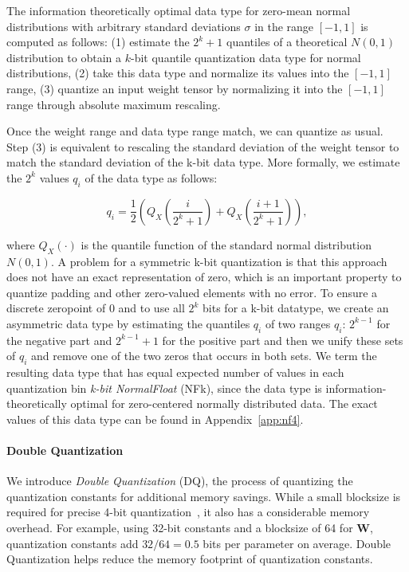 The information theoretically optimal data type for zero-mean normal distributions with arbitrary standard deviations $\sigma$ in the range $[-1, 1]$ is computed as follows: (1) estimate the $2^k+1$ quantiles of a theoretical $N(0, 1)$ distribution to obtain a $k$-bit quantile quantization data type for normal distributions, (2) take this data type and normalize its values into the $[-1, 1]$ range, (3) quantize an input weight tensor by normalizing it into the $[-1, 1]$ range through absolute maximum rescaling. 

Once the weight range and data type range match, we can quantize as usual. Step (3) is equivalent to rescaling the standard deviation of the weight tensor to match the standard deviation of the k-bit data type. More formally, we estimate the $2^k$ values $q_i$ of the data type as follows:

\begin{equation}
q_i  = \frac{1}{2}\left( Q_X\left(\frac{i}{2^k+1}\right) + Q_X\left(\frac{i+1}{2^k+1}\right)\right),
\end{equation}

where $Q_X(\cdot)$ is the quantile function of the standard normal distribution $N(0,1)$. A problem for a symmetric k-bit quantization is that this approach does not have an exact representation of zero, which is an important property to quantize padding and other zero-valued elements with no error. To ensure a discrete zeropoint of $0$ and to use all $2^k$ bits for a k-bit datatype, we create an asymmetric data type by estimating the quantiles $q_i$ of two ranges $q_i$: $2^{k-1}$ for the negative part and $2^{k-1}+1$ for the positive part and then we unify these sets of $q_i$ and remove one of the two zeros that occurs in both sets. We term the resulting data type that has equal expected number of values in each quantization bin \emph{k-bit NormalFloat} (NFk), since the data type is information-theoretically optimal for zero-centered normally distributed data. The exact values of this data type can be found in Appendix~\ref{app:nf4}.

\paragraph{Double Quantization} We introduce \emph{Double Quantization} (DQ), the process of quantizing the quantization constants for additional memory savings. While a small blocksize is required for precise 4-bit quantization~\citep{dettmers2022case}, it also has a considerable memory overhead. For example, using 32-bit constants and a blocksize of 64 for $\mathbf{W}$, quantization constants add $32/64 = 0.5$ bits per parameter on average. Double Quantization helps reduce the memory footprint of quantization constants.


